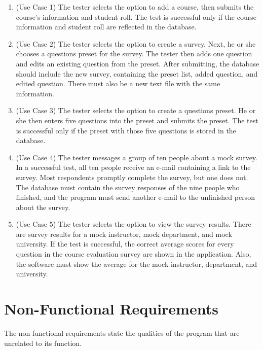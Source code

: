 \documentclass{article}
\begin{document}
\begin{enumerate}
  \item (Use Case 1) The tester selects the option to add a course, then submits the course's information and student roll. The test is successful only if the course information and student roll are reflected in the database.
  \item (Use Case 2) The tester selects the option to create a survey. Next, he or she chooses a questions preset for the survey. The tester then adds one question and edits an existing question from the preset. After submitting, the database should include the new survey, containing the preset list, added question, and edited question. There must also be a new text file with the same information.
  \item (Use Case 3) The tester selects the option to create a questions preset. He or she then enters five questions into the preset and submits the preset. The test is successful only if the preset with those five questions is stored in the database.
  \item (Use Case 4) The tester messages a group of ten people about a mock survey. In a successful test, all ten people receive an e-mail containing a link to the survey. Most respondents promptly complete the survey, but one does not. The database must contain the survey responses of the nine people who finished, and the program must send another e-mail to the unfinished person about the survey.
  \item (Use Case 5) The tester selects the option to view the survey results. There are survey results for a mock instructor, mock department, and mock university. If the test is successful, the correct average scores for every question in the course evaluation survey are shown in the application. Also, the software must show the average for the mock instructor, department, and university.
\end{enumerate}

\section{Non-Functional Requirements}

The non-functional requirements state the qualities of the program that are unrelated to its function.
\end{document}

